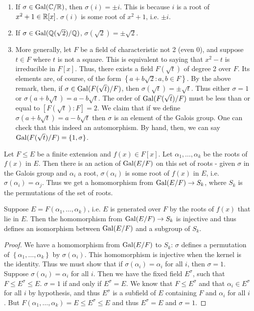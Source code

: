 \documentclass{../mathnotes}
\begin{document}
\begin{exmp}
    \begin{enumerate}
        \item If $\sigma\in\operatorname{Gal}(\mathbb{C}/\mathbb{R})$, then $\sigma(i)=\pm i$. This is because $i$ is a root of $x^2+1\in\mathbb{R}[x]$.
            $\sigma(i)$ is some root of $x^2+1$, i.e. $\pm i$.
        \item If $\sigma\in\operatorname{Gal}(\mathbb{Q}(\sqrt{2})/\mathbb{Q})$, $\sigma(\sqrt{2})=\pm\sqrt{2}$.
        \item More generally, let $F$ be a field of characteristic not 2 (even 0), and suppose $t\in F$ where $t$ is not a square.
            This is equivalent to saying that $x^2-t$ is irreducible in $F[x]$. Thus, there exists a field $F(\sqrt{t})$ of degree 2
            over $F$. Its elements are, of course, of the form $\left\{ a+b\sqrt{2}:a,b\in F \right\}$. By the above remark, then,
            if $\sigma\in\operatorname{Gal}(F(\sqrt{t})/F)$, then $\sigma(\sqrt{t})=\pm \sqrt{t}$. Thus either $\sigma=1$ or $\sigma(a+b\sqrt{t})=a-b\sqrt{t}$.
            The order of $\operatorname{Gal}(F(\sqrt{t})/F)$ must be less than or equal to $[F(\sqrt{t}):F]=2$. We claim that if we define $\sigma(a+b\sqrt{t})=a-b\sqrt{t}$
            then $\sigma$ is an element of the Galois group. One can check that this indeed an automorphism. By hand, then, we can
            say $\operatorname{Gal}(F(\sqrt{t})/F)=\left\{ 1,\sigma \right\}$.
    \end{enumerate}
\end{exmp}

\begin{rem}
    Let $F\leq E$ be a finite extension and $f(x)\in F[x]$. Let $\alpha_1,\ldots,\alpha_k$ be the roots of $f(x)$ in $E$.
    Then there is an action of $\operatorname{Gal}(E/F)$ on this set of roots - given $\sigma$ in the Galois group and $\alpha_i$ a root,
    $\sigma(\alpha_i)$ is some root of $f(x)$ in $E$, i.e. $\sigma(\alpha_i)=\alpha_j$. Thus we get a homomorphism from
    $\operatorname{Gal}(E/F)\to S_k$, where $S_k$ is the permutations of the set of roots.
\end{rem}

\begin{thm}
    Suppose $E=F(\alpha_1,\ldots,\alpha_k)$, i.e. $E$ is generated over $F$ by the roots of $f(x)$ that lie in $E$.
    Then the homomorphism from $\operatorname{Gal}(E/F)\to S_k$ is injective and thus defines an isomorphism between $\operatorname{Gal}(E/F)$
    and a subgroup of $S_k$.
\end{thm}
\begin{proof}
    We have a homomorphism from $\operatorname{Gal}(E/F)$ to $S_k$: $\sigma$ defines a permutation of $\left\{ \alpha_1,\ldots,\alpha_k \right\}$
    by $\sigma(\alpha_i)$. This homomorphism is injective when the kernel is the identity. Thus we must show that if $\sigma(\alpha_i)=\alpha_i$
    for all $i$, then $\sigma=1$. Suppose $\sigma(\alpha_i)=\alpha_i$ for all $i$. Then we have the fixed field $E^\sigma$, such that
    $F\leq E^\sigma\leq E$. $\sigma=1$ if and only if $E^\sigma=E$. We know that $F\leq E^\sigma$ and that $\alpha_i\in E^\sigma$ for all $i$
    by hypothesis, and thus $E^\sigma$ is a subfield of $E$ containing $F$ and $\alpha_i$ for all $i$. But $F(\alpha_1,\ldots,\alpha_k)=E\leq E^\sigma\leq E$
    and thus $E^\sigma=E$ and $\sigma=1$.
\end{proof}
\end{document}

